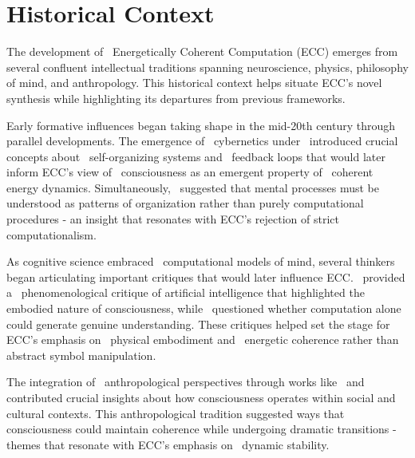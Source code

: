 \section{Historical Context}

The development of~ Energetically Coherent Computation (ECC) emerges from several confluent intellectual traditions spanning neuroscience, physics, philosophy of mind, and anthropology. This historical context helps situate ECC's novel synthesis while highlighting its departures from previous frameworks.

Early formative influences began taking shape in the mid-20th century through parallel developments. The emergence of~ cybernetics under~\cite{wiener1948cybernetics} introduced crucial concepts about~ self-organizing systems and~ feedback loops that would later inform ECC's view of~ consciousness as an emergent property of~ coherent energy dynamics. Simultaneously,~\cite{bateson1972steps} suggested that mental processes must be understood as patterns of organization rather than purely computational procedures - an insight that resonates with ECC's rejection of strict~ computationalism.

As cognitive science embraced~ computational models of mind, several thinkers began articulating important critiques that would later influence ECC.~\cite{dreyfus1972computers} provided a~ phenomenological critique of artificial intelligence that highlighted the~ embodied nature of consciousness, while~\cite{searle1980minds} questioned whether computation alone could generate genuine understanding. These critiques helped set the stage for ECC's emphasis on~ physical embodiment and~ energetic coherence rather than abstract symbol manipulation.

The integration of~ anthropological perspectives through works like~\cite{rappaport1979ecology} and~\cite{turner1967forest} contributed crucial insights about how consciousness operates within social and cultural contexts. This anthropological tradition suggested ways that consciousness could maintain coherence while undergoing dramatic transitions - themes that resonate with ECC's emphasis on~ dynamic stability.

